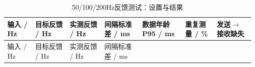 \FloatBarrier\begingroup\small\setlength{\tabcolsep}{2.5pt}
\begin{longtable}[]{@{}
  >{\raggedright\arraybackslash}p{}
  >{\raggedright\arraybackslash}p{}
  >{\raggedright\arraybackslash}p{}
  >{\raggedright\arraybackslash}p{}
  >{\raggedright\arraybackslash}p{}
  >{\raggedright\arraybackslash}p{}
  >{\raggedright\arraybackslash}p{}@{}}
\caption{50/100/200Hz反馈测试：设置与结果}\label{tab:s08-1}\tabularnewline
\toprule\noalign{}
\begin{minipage}[b]{\linewidth}\raggedright
输入 / Hz
\end{minipage} & \begin{minipage}[b]{\linewidth}\raggedright
目标反馈 / Hz
\end{minipage} & \begin{minipage}[b]{\linewidth}\raggedright
实测反馈 / Hz
\end{minipage} & \begin{minipage}[b]{\linewidth}\raggedright
间隔标准差 / ms
\end{minipage} & \begin{minipage}[b]{\linewidth}\raggedright
数据年龄P95 / ms
\end{minipage} & \begin{minipage}[b]{\linewidth}\raggedright
重复测量 / \%
\end{minipage} & \begin{minipage}[b]{\linewidth}\raggedright
发送\(\rightarrow\)接收缺失
\end{minipage} \\
\midrule\noalign{}
\endfirsthead
\toprule\noalign{}
\begin{minipage}[b]{\linewidth}\raggedright
输入 / Hz
\end{minipage} & \begin{minipage}[b]{\linewidth}\raggedright
目标反馈 / Hz
\end{minipage} & \begin{minipage}[b]{\linewidth}\raggedright
实测反馈 / Hz
\end{minipage} & \begin{minipage}[b]{\linewidth}\raggedright
间隔标准差 / ms
\end{minipage} & \begin{minipage}[b]{\linewidth}\raggedright

\end{minipage}
\end{longtable}

